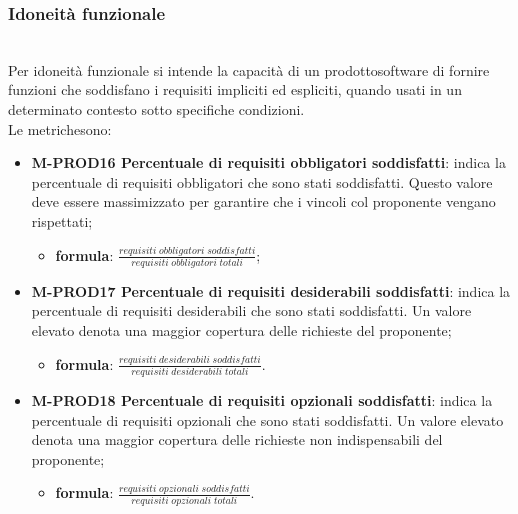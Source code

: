 		\subsubsection{Idoneità funzionale} \mbox{}\\[1mm]
		Per idoneità funzionale si intende la capacità di un prodotto\glosp software di fornire funzioni che soddisfano i requisiti impliciti ed espliciti, quando usati in un determinato contesto sotto specifiche condizioni. \\
		Le metriche\glosp sono:
		\begin{itemize}
			\item \textbf{M-PROD16 Percentuale di requisiti obbligatori soddisfatti}: indica la percentuale di requisiti obbligatori che sono stati soddisfatti. Questo valore deve essere massimizzato per garantire che i vincoli col proponente vengano rispettati;
			\begin{itemize}
				\item[] \textbf{formula}: $\frac{requisiti \; obbligatori \; soddisfatti}{requisiti \; obbligatori \; totali}$;
			\end{itemize} 
			\item \textbf{M-PROD17 Percentuale di requisiti desiderabili soddisfatti}:
			indica la percentuale di requisiti desiderabili che sono stati soddisfatti. Un valore elevato denota una maggior copertura delle richieste del proponente;
			\begin{itemize}
				\item[] \textbf{formula}: $\frac{requisiti \; desiderabili \; soddisfatti}{requisiti \; desiderabili \; totali}$.
			\end{itemize} 
			\item \textbf{M-PROD18 Percentuale di requisiti opzionali soddisfatti}:
			indica la percentuale di requisiti opzionali che sono stati soddisfatti. Un valore elevato denota una maggior copertura delle richieste non indispensabili  del proponente;
			\begin{itemize}
				\item[] \textbf{formula}: $\frac{requisiti \; opzionali \; soddisfatti}{requisiti \; opzionali \; totali}$.
			\end{itemize} 

		\end{itemize}
	
